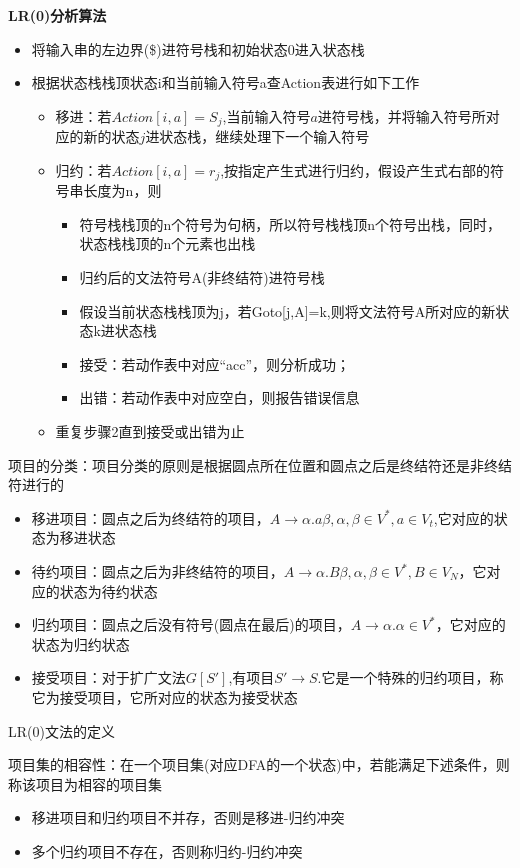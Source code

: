 \documentclass[utf8]{ctexart}
\begin{document}
\noindent \textbf{LR(0)分析算法}
\begin{itemize}
    \item 将输入串的左边界(\$)进符号栈和初始状态0进入状态栈
    \item 根据状态栈栈顶状态i和当前输入符号a查Action表进行如下工作
    \begin{itemize}
        \item 移进：若$Action[i,a]=S_j$,当前输入符号$a$进符号栈，并将输入符号所对应的新的状态$j$进状态栈，继续处理下一个输入符号
        \item 归约：若$Action[i,a]=r_j$,按指定产生式进行归约，假设产生式右部的符号串长度为n，则
        \begin{itemize}
            \item 符号栈栈顶的n个符号为句柄，所以符号栈栈顶n个符号出栈，同时，状态栈栈顶的n个元素也出栈
            \item 归约后的文法符号A(非终结符)进符号栈
            \item 假设当前状态栈栈顶为j，若Goto[j,A]=k,则将文法符号A所对应的新状态k进状态栈
            \item 接受：若动作表中对应“acc”，则分析成功；
            \item 出错：若动作表中对应空白，则报告错误信息
        \end{itemize}
        \item 重复步骤2直到接受或出错为止
    \end{itemize}
\end{itemize}

项目的分类：项目分类的原则是根据圆点所在位置和圆点之后是终结符还是非终结符进行的
\begin{itemize}
    \item 移进项目：圆点之后为终结符的项目，$A\rightarrow \alpha.a\beta ,\alpha ,\beta \in V^*,a \in V_t$,它对应的状态为移进状态
    \item 待约项目：圆点之后为非终结符的项目，$A \rightarrow \alpha.B\beta ,\alpha , \beta \in V^*, B \in V_N$，它对应的状态为待约状态
    \item 归约项目：圆点之后没有符号(圆点在最后)的项目，$A \rightarrow \alpha . \alpha \in V^*$，它对应的状态为归约状态
    \item 接受项目：对于扩广文法$G[S']$,有项目$S' \rightarrow S$.它是一个特殊的归约项目，称它为接受项目，它所对应的状态为接受状态
\end{itemize}

\noindent LR(0)文法的定义

项目集的相容性：在一个项目集(对应DFA的一个状态)中，若能满足下述条件，则称该项目为相容的项目集
\begin{itemize}
    \item 移进项目和归约项目不并存，否则是移进-归约冲突
    \item 多个归约项目不存在，否则称归约-归约冲突
\end{itemize}
\end{document}
